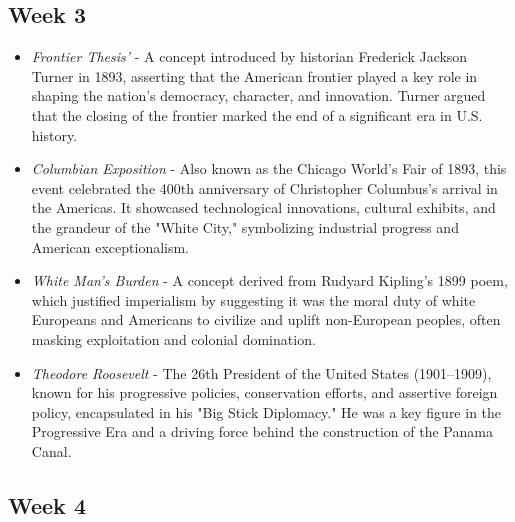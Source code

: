 \documentclass[12pt]{article}
\begin{document}
\subsection*{Week 3}

\begin{itemize}
    \item \textit{Frontier Thesis’} - A concept introduced by historian Frederick Jackson Turner in 1893, asserting that the American frontier played a key role in shaping the nation's democracy, character, and innovation. Turner argued that the closing of the frontier marked the end of a significant era in U.S. history.
    
    \item \textit{Columbian Exposition} - Also known as the Chicago World's Fair of 1893, this event celebrated the 400th anniversary of Christopher Columbus's arrival in the Americas. It showcased technological innovations, cultural exhibits, and the grandeur of the "White City," symbolizing industrial progress and American exceptionalism.
    
    \item \textit{White Man’s Burden} - A concept derived from Rudyard Kipling’s 1899 poem, which justified imperialism by suggesting it was the moral duty of white Europeans and Americans to civilize and uplift non-European peoples, often masking exploitation and colonial domination.
    
    \item \textit{Theodore Roosevelt} - The 26th President of the United States (1901–1909), known for his progressive policies, conservation efforts, and assertive foreign policy, encapsulated in his "Big Stick Diplomacy." He was a key figure in the Progressive Era and a driving force behind the construction of the Panama Canal.
\end{itemize}

\subsection*{Week 4}
\end{document}
